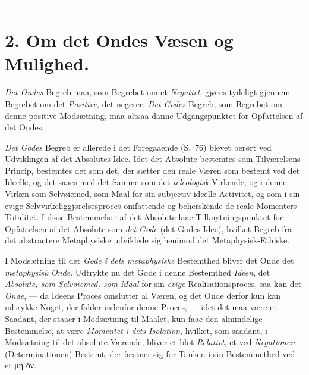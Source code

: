 \begin{center}\rule{2cm}{0.4pt}\end{center}

 \section*{2. Om det Ondes Væsen og Mulighed.}
\emph{Det Ondes} Begreb maa, som Begrebet om et \emph{Negativt}, gjøres tydeligt
gjennem Begrebet om det \emph{Positive}, det negerer. \emph{Det Godes} Begreb,
som Begrebet om denne positive Modsætning, maa altsaa danne Udgangspunktet for
Opfattelsen af det Ondes.

\emph{Det Godes} Begreb er allerede i det Foregaaende (S.\ 76) blevet berørt ved
Udviklingen af det Absolutes Idee. Idet det Absolute bestemtes som Tilværelsens
Princip, bestemtes det som det, der sætter den reale Væren som bestemt ved det
Ideelle, og det saaes med det Samme som det \emph{teleologisk} Virkende, og i
denne Virken som Selvøiemed, som Maal for sin subjectiv-ideelle Activitet, og
som i sin evige Selvvirkeliggjørelsesproces omfattende og beherskende de reale
Momenters Totalitet. I disse Bestemmelser af det Absolute laae
Tilknytningspunktet for Opfattelsen af det Absolute som \emph{det Gode} (det
Godes Idee), hvilket Begreb fra det abstractere Metaphysiske udviklede sig
henimod det Metaphysisk-Ethiske.

I Modsætning til det \emph{Gode i dets metaphysiske} Bestemthed bliver det Onde
det \emph{metaphysisk Onde}. Udtrykte nu det Gode i denne Bestemthed
\emph{Ideen}, det \emph{Absolute, som Selvøiemed, som Maal} for sin \emph{evige}
Realisationsproces, saa kan det \emph{Onde}, --- da Ideens Proces omslutter al
Væren, og det Onde derfor kun kan udtrykke Noget, der falder indenfor denne
Proces, --- idet det maa være et Saadant, der staaer i Modsætning til Maalet,
kun faae den almindelige Bestemmelse, at være \emph{Momentet i dets Isolation},
hvilket, som saadant, i Modsætning til det absolute Værende, bliver et blot
\emph{Relativt}, et ved \emph{Negationen} (Determinationen) Bestemt, der fæstner
sig for Tanken i sin Bestemmethed ved et μὴ ὄν.

